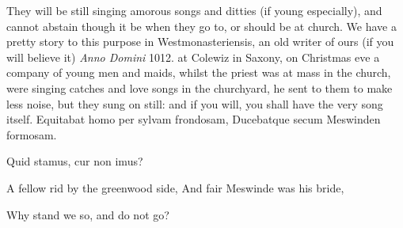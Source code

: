 {They will be still singing amorous songs and ditties (if young
especially), and cannot abstain though it be when they go to, or should
be at church. We have a pretty story to this purpose in
Westmonasteriensis, an old writer of ours (if you will believe
it) \emph{Anno Domini} 1012. at Colewiz in Saxony, on Christmas eve a company
of young men and maids, whilst the priest was at mass in the church,
were singing catches and love songs in the churchyard, he sent to them
to make less noise, but they sung on still: and if you will, you shall
have the very song itself.
Equitabat homo per sylvam frondosam,
Ducebatque secum Meswinden formosam.

Quid stamus, cur non imus?


A fellow rid by the greenwood side,
And fair Meswinde was his bride,

Why stand we so, and do not go?

}
